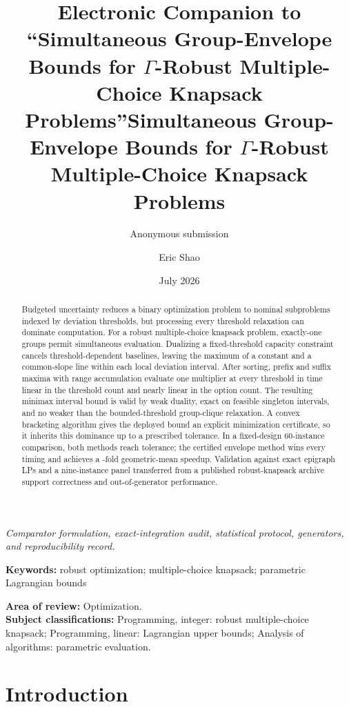 \documentclass[11pt]{article}
\title{Electronic Companion to ``Simultaneous Group-Envelope Bounds for $\Gamma$-Robust Multiple-Choice Knapsack Problems''}
\title{Simultaneous Group-Envelope Bounds for $\Gamma$-Robust Multiple-Choice Knapsack Problems}
\author{Anonymous submission}
\affil{}
\author{Eric Shao}
\affil{Department of Mathematics, ETH Z\"urich, \texttt{ershao@student.ethz.ch}}
\date{}
\date{July 2026}
\theoremstyle{plain}
\theoremstyle{definition}
\theoremstyle{remark}
\newcommand{\keywords}[1]{\par\medskip\noindent\textbf{Keywords:} #1}
\begin{document}
\maketitle

\ifcompanion
\begin{center}
\emph{Comparator formulation, exact-integration audit, statistical protocol, generators, and reproducibility record.}
\end{center}
\else

\begin{abstract}
Budgeted uncertainty reduces a binary optimization problem to nominal subproblems indexed by deviation thresholds, but processing every threshold relaxation can dominate computation.  For a robust multiple-choice knapsack problem, exactly-one groups permit simultaneous evaluation.  Dualizing a fixed-threshold capacity constraint cancels threshold-dependent baselines, leaving the maximum of a constant and a common-slope line within each local deviation interval.  After sorting, prefix and suffix maxima with range accumulation evaluate one multiplier at every threshold in time linear in the threshold count and nearly linear in the option count.  The resulting minimax interval bound is valid by weak duality, exact on feasible singleton intervals, and no weaker than the bounded-threshold group-clique relaxation.  A convex bracketing algorithm gives the deployed bound an explicit minimization certificate, so it inherits this dominance up to a prescribed tolerance.  In a fixed-design 60-instance comparison, both methods reach tolerance; the certified envelope method wins every timing and achieves a \PubPrimaryGeoSpeedup-fold geometric-mean speedup.  Validation against exact epigraph LPs and a nine-instance panel transferred from a published robust-knapsack archive support correctness and out-of-generator performance.
\end{abstract}

\keywords{robust optimization; multiple-choice knapsack; parametric Lagrangian bounds}

\noindent\textbf{Area of review:} Optimization.\\
\textbf{Subject classifications:} Programming, integer: robust multiple-choice knapsack; Programming, linear: Lagrangian upper bounds; Analysis of algorithms: parametric evaluation.

\section{Introduction}\label{sec:introduction}
\end{document}
